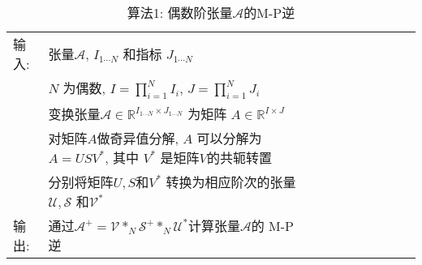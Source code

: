 \begin{table} [!ht]
\caption{算法1: 偶数阶张量$\mathcal A$的M-P逆 \cite{HuangZhao2018NCAA-5838}}
\label{T2RVFL3:alg1}
\vspace{-0.5cm}
\begin{center}
\begin{tabular} {p{1.05cm}p{9.25cm}llcccccc}
\hline
输入:& 张量$\mathcal A$, $I_{1 \cdots N} $ 和指标 $J_{1 \cdots N} $\\
&$N$ 为偶数, $I=\prod_{i=1} ^N I_i$, $J=\prod_{i=1} ^N J_i$\\
&变换张量$\mathcal A\in \mathbb R^{I_{1 \cdots N} \times J_{1 \cdots N} } $ 为矩阵 $A\in \mathbb R^{I\times J} $\\
&对矩阵$A$做奇异值分解, $A$ 可以分解为 $A=U S V^*$, 其中 $V^*$ 是矩阵$V$的共轭转置\\
&分别将矩阵$U, S$和$V^*$ 转换为相应阶次的张量$\mathcal U, \mathcal S$ 和$\mathcal V^*$\\
输出:& 通过$\mathcal A^+ = \mathcal V *_N\mathcal S^+ *_N \mathcal U^*$计算张量$\mathcal A$的 M-P逆\\
\hline
\end{tabular}
\end{center}
\end{table}

